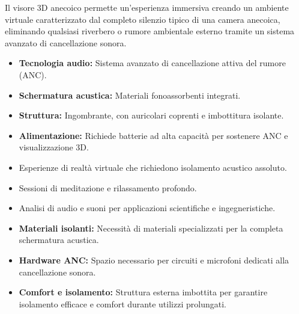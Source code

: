 \vspace{0.5cm}

\begin{tcolorbox}[fontupper=\small, colback=white, colframe=black, title=\textbf{Visore 3D Anecoico}]
Il visore 3D anecoico permette un'esperienza immersiva creando un ambiente virtuale caratterizzato dal completo silenzio tipico di una camera anecoica, eliminando qualsiasi riverbero o rumore ambientale esterno tramite un sistema avanzato di cancellazione sonora.
\end{tcolorbox}

\begin{tcolorbox}[fontupper=\small, colback=white, colframe=black, title=\textbf{Caratteristiche}]
\begin{itemize}
    \item \textbf{Tecnologia audio:} Sistema avanzato di cancellazione attiva del rumore (ANC).
    \item \textbf{Schermatura acustica:} Materiali fonoassorbenti integrati.
    \item \textbf{Struttura:} Ingombrante, con auricolari coprenti e imbottitura isolante.
    \item \textbf{Alimentazione:} Richiede batterie ad alta capacità per sostenere ANC e visualizzazione 3D.
\end{itemize}
\end{tcolorbox}

\begin{tcolorbox}[fontupper=\small, colback=white, colframe=black, title=\textbf{Applicazioni}]
\begin{itemize}
    \item Esperienze di realtà virtuale che richiedono isolamento acustico assoluto.
    \item Sessioni di meditazione e rilassamento profondo.
    \item Analisi di audio e suoni per applicazioni scientifiche e ingegneristiche.
\end{itemize}
\end{tcolorbox}

\begin{tcolorbox}[fontupper=\small, colback=white, colframe=black, title=\textbf{Motivazioni dell'Ingombro}]
\begin{itemize}
    \item \textbf{Materiali isolanti:} Necessità di materiali specializzati per la completa schermatura acustica.
    \item \textbf{Hardware ANC:} Spazio necessario per circuiti e microfoni dedicati alla cancellazione sonora.
    \item \textbf{Comfort e isolamento:} Struttura esterna imbottita per garantire isolamento efficace e comfort durante utilizzi prolungati.
\end{itemize}
\end{tcolorbox}



